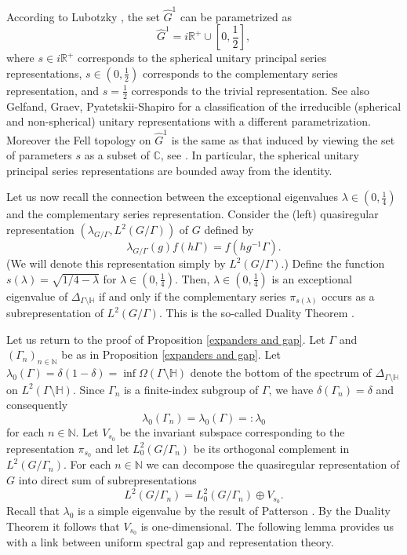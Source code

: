 \documentclass[12pt]{article}
\newcommand{\RR}{\mathbb{R}}
\newcommand{\NN}{\mathbb{N}}
\newcommand{\CC}{\mathbb{C}}
\newcommand{\HH}{\mathbb{H}}
\begin{document}
According to Lubotzky \cite[Chapter~5]{Lubotzky}, the set $ \hat{G}^{1} $ can be parametrized as 
$$ \hat{G}^{1} = i\RR^{+} \cup \left[ 0, \frac{1}{2}\right], $$
where $ s\in i\RR^{+} $ corresponds to the spherical unitary principal series representations, $ s\in (0, \frac{1}{2}) $ corresponds to the complementary series representation, and $ s = \frac{1}{2} $ corresponds to the trivial representation. See also Gelfand, Graev, Pyatetskii-Shapiro \cite[Chapter~1 §3]{Gelfand} for a classification of the irreducible (spherical and non-spherical) unitary representations with a different parametrization. Moreover the Fell topology on $ \hat{G}^{1} $ is the same as that induced by viewing the set of parameters $ s $ as a subset of $ \CC $, see \cite[Chapter~5]{Lubotzky}. In particular, the spherical unitary principal series representations are bounded away from the identity.

Let us now recall the connection between the exceptional eigenvalues $ \lambda \in (0, \frac{1}{4}) $ and the complementary series representation.  Consider the (left) quasiregular representation $ (\lambda_{G/\Gamma}, L^{2}(G/\Gamma)) $ of $ G $ defined by 
$$ \lambda_{G/\Gamma}(g)f(h\Gamma) = f(hg^{-1}\Gamma). $$ 
(We will denote this representation simply by $ L^{2}(G/\Gamma) $.) Define the function $ s(\lambda) = \sqrt{1/4 - \lambda} $ for $ \lambda\in (0, \frac{1}{4}) $. Then, $ \lambda\in (0, \frac{1}{4}) $ is an exceptional eigenvalue of $ \Delta_{\Gamma\setminus \HH} $ if and only if the complementary series $ \pi_{s(\lambda)} $ occurs as a subrepresentation of $  L^{2}(G/\Gamma) $. This is the so-called Duality Theorem \cite[Chapter~1 §4]{Gelfand}.

Let us return to the proof of Proposition \ref{expanders and gap}. Let $ \Gamma $ and $ (\Gamma_{n})_{n\in \NN} $ be as in Proposition \ref{expanders and gap}. Let $ \lambda_{0}(\Gamma) = \delta(1-\delta) = \inf \Omega(\Gamma\setminus \HH) $ denote the bottom of the spectrum of $ \Delta_{\Gamma\setminus \HH} $ on $ L^{2}(\Gamma\setminus \HH) $. Since $ \Gamma_{n} $ is a finite-index subgroup of $ \Gamma $, we have $ \delta(\Gamma_{n}) = \delta $ and consequently
$$ \lambda_{0}(\Gamma_{n}) = \lambda_{0}(\Gamma) =:\lambda_{0} $$
for each $ n\in \NN $. 
Let $ V_{s_{0}} $ be the invariant subspace corresponding to the representation $ \pi_{s_{0}} $ and let $ L_{0}^{2}(G/\Gamma_{n}) $ be its orthogonal complement in $ L^{2}(G/\Gamma_{n}). $ For each $ n\in \NN $ we can decompose the quasiregular representation of $ G $ into direct sum of subrepresentations 
$$ L^{2}(G/\Gamma_{n}) =  L_{0}^{2}(G/\Gamma_{n}) \oplus V_{s_{0}}. $$
Recall that $ \lambda_{0} $ is a simple eigenvalue by the result of Patterson \cite{Patt2}. By the Duality Theorem it follows that $ V_{s_{0}} $ is one-dimensional. The following lemma provides us with a link between uniform spectral gap and representation theory.
\end{document}
